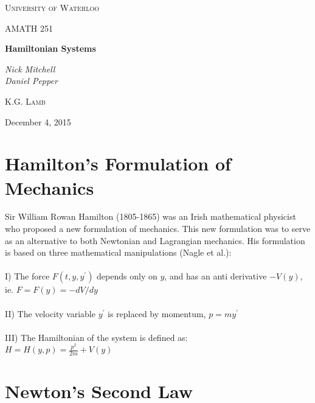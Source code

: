 \documentclass[12pt]{article}
\begin{document}
	
	
	\begin{titlepage}
        \centering
		{\scshape\LARGE University of Waterloo \par}
		\vspace{1cm}
		{\scshape\Large AMATH 251\par}
		\vspace{1.5cm}
		{\huge\bfseries Hamiltonian Systems \par}
		\vspace{2cm}
		{\Large\itshape Nick Mitchell\\Daniel Pepper\par}
		\vfill
		\par
		\textsc{K.G. Lamb}
		\vfill
		{\large December 4, 2015 \par}
	\end{titlepage}
	
	\section{Hamilton's Formulation of Mechanics}
	
	\indent \indent Sir William Rowan Hamilton (1805-1865) was an Irish mathematical physicist who proposed a new formulation of mechanics. This new formulation was to serve as an alternative to both Newtonian and Lagrangian mechanics. His formulation is based on three mathematical manipulations (Nagle et al.):
	\\
	\\
	I) The force $F(t,y,y^\prime)$ depends only on $y$, and has an anti derivative $-V(y)$, 
	\\ \indent ie. $F=F(y)=-dV/dy$
	\\
	\\
	II) The velocity variable $y^\prime$ is replaced by momentum, $p=my^\prime$
	\\
	\\
	III) The Hamiltonian of the system is defined as:
	\\ 
	\indent $H=H(y,p)=\frac{p^2}{2m} + V(y)$
	
	\section{Newton's Second Law}
	
\end{document}
